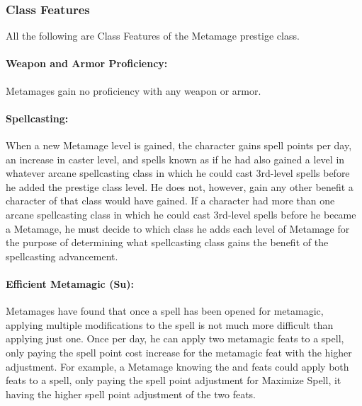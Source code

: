\subsubsection{Class Features}
All the following are Class Features of the Metamage prestige class.

\paragraph{Weapon and Armor Proficiency:} Metamages gain no proficiency with any weapon or armor.

\paragraph{Spellcasting:} When a new Metamage level is gained, the character gains spell points per day, an increase in caster level, and spells known as if he had also gained a level in whatever arcane spellcasting class in which he could cast 3rd-level spells before he added the prestige class level. 
He does not, however, gain any other benefit a character of that class would have gained. 
If a character had more than one arcane spellcasting class in which he could cast 3rd-level spells before he became a Metamage, he must decide to which class he adds each level of Metamage for the purpose of determining what spellcasting class gains the benefit of the spellcasting advancement.


\paragraph{Efficient Metamagic (Su):}
Metamages have found that once a spell has been opened for metamagic, applying multiple modifications to the spell is not much more difficult than applying just one. 
Once per day, he can apply two metamagic feats to a spell, only paying the spell point cost increase for the metamagic feat with the higher adjustment. For example, a Metamage knowing the  and  feats could apply both feats to a spell, only paying the spell point adjustment for Maximize Spell, it having the higher spell point adjustment of the two feats.

